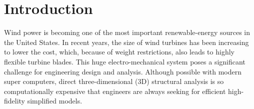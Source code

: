 \section{Introduction} 

Wind power is becoming one of the most important renewable-energy sources in
the United States.
In recent years, the size of wind
turbines has been increasing to lower the cost, which, because of
weight restrictions, also leads
to highly flexible turbine blades. This huge electro-mechanical system poses
a significant challenge for engineering design and analysis. Although
possible with modern super computers, direct three-dimensional (3D)
structural analysis is so computationally expensive that engineers are
always seeking for efficient high-fidelity simplified models.

